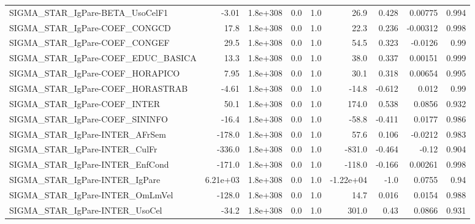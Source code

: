 \begin{tabular}{lrrrrrrrr}
SIGMA\_STAR\_IgPare-BETA\_UsoCelF1       &       -3.01 &     1.8e+308 &      0.0 &      1.0 &       26.9 &       0.428 &      0.00775 &         0.994 \\
SIGMA\_STAR\_IgPare-COEF\_CONGCD         &        17.8 &     1.8e+308 &      0.0 &      1.0 &       22.3 &       0.236 &     -0.00312 &         0.998 \\
SIGMA\_STAR\_IgPare-COEF\_CONGEF         &        29.5 &     1.8e+308 &      0.0 &      1.0 &       54.5 &       0.323 &      -0.0126 &          0.99 \\
SIGMA\_STAR\_IgPare-COEF\_EDUC\_BASICA    &        13.3 &     1.8e+308 &      0.0 &      1.0 &       38.0 &       0.337 &      0.00151 &         0.999 \\
SIGMA\_STAR\_IgPare-COEF\_HORAPICO       &        7.95 &     1.8e+308 &      0.0 &      1.0 &       30.1 &       0.318 &      0.00654 &         0.995 \\
SIGMA\_STAR\_IgPare-COEF\_HORASTRAB      &       -4.61 &     1.8e+308 &      0.0 &      1.0 &      -14.8 &      -0.612 &        0.012 &          0.99 \\
SIGMA\_STAR\_IgPare-COEF\_INTER          &        50.1 &     1.8e+308 &      0.0 &      1.0 &      174.0 &       0.538 &       0.0856 &         0.932 \\
SIGMA\_STAR\_IgPare-COEF\_SININFO        &       -16.4 &     1.8e+308 &      0.0 &      1.0 &      -58.8 &      -0.411 &       0.0177 &         0.986 \\
SIGMA\_STAR\_IgPare-INTER\_AFrSem        &      -178.0 &     1.8e+308 &      0.0 &      1.0 &       57.6 &       0.106 &      -0.0212 &         0.983 \\
SIGMA\_STAR\_IgPare-INTER\_CulFr         &      -336.0 &     1.8e+308 &      0.0 &      1.0 &     -831.0 &      -0.464 &        -0.12 &         0.904 \\
SIGMA\_STAR\_IgPare-INTER\_EnfCond       &      -171.0 &     1.8e+308 &      0.0 &      1.0 &     -118.0 &      -0.166 &      0.00261 &         0.998 \\
SIGMA\_STAR\_IgPare-INTER\_IgPare        &    6.21e+03 &     1.8e+308 &      0.0 &      1.0 &  -1.22e+04 &        -1.0 &       0.0755 &          0.94 \\
SIGMA\_STAR\_IgPare-INTER\_OmLmVel       &      -128.0 &     1.8e+308 &      0.0 &      1.0 &       14.7 &       0.016 &       0.0154 &         0.988 \\
SIGMA\_STAR\_IgPare-INTER\_UsoCel        &       -34.2 &     1.8e+308 &      0.0 &      1.0 &      301.0 &        0.43 &       0.0866 &         0.931 \\

\end{tabular}
